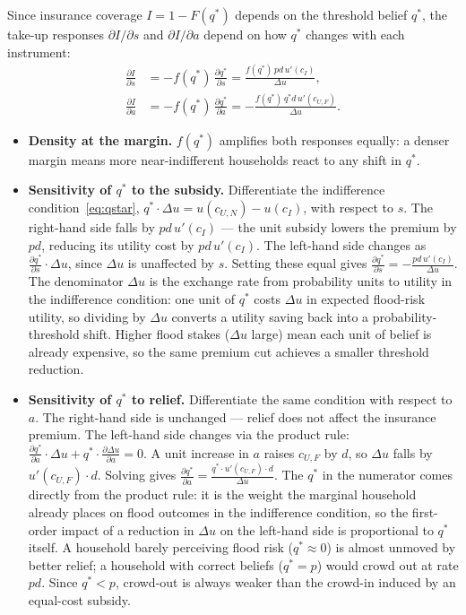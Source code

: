 \documentclass[12pt]{article}
\begin{document}
Since insurance coverage $I = 1 - F(q^*)$ depends on the threshold belief $q^*$, the take-up responses $\partial I/\partial s$ and $\partial I/\partial a$ depend on how $q^*$ changes with each instrument:
\begin{align}
    \frac{\partial I}{\partial s} &= -f(q^*)\,\frac{\partial q^*}{\partial s}
    = \frac{f(q^*)\,pd\,u'(c_I)}{\Delta u}, \label{eq:dI_s} \\
    \frac{\partial I}{\partial a} &= -f(q^*)\,\frac{\partial q^*}{\partial a}
    = -\frac{f(q^*)\,q^*d\,u'(c_{U,F})}{\Delta u}. \label{eq:dI_a}
\end{align}
\begin{itemize}
    \item \textbf{Density at the margin.} $f(q^*)$ amplifies both responses equally: a denser margin means more near-indifferent households react to any shift in $q^*$.

    \item \textbf{Sensitivity of $q^*$ to the subsidy.}
    Differentiate the indifference condition~\eqref{eq:qstar}, $q^*\cdot\Delta u = u(c_{U,N})-u(c_I)$, with respect to $s$. The right-hand side falls by $pd\,u'(c_I)$ — the unit subsidy lowers the premium by $pd$, reducing its utility cost by $pd\,u'(c_I)$. The left-hand side changes as $\frac{\partial q^*}{\partial s}\cdot\Delta u$, since $\Delta u$ is unaffected by $s$. Setting these equal gives $\frac{\partial q^*}{\partial s}=-\frac{pd\,u'(c_I)}{\Delta u}$. The denominator $\Delta u$ is the exchange rate from probability units to utility in the indifference condition: one unit of $q^*$ costs $\Delta u$ in expected flood-risk utility, so dividing by $\Delta u$ converts a utility saving back into a probability-threshold shift. Higher flood stakes ($\Delta u$ large) mean each unit of belief is already expensive, so the same premium cut achieves a smaller threshold reduction.

    \item \textbf{Sensitivity of $q^*$ to relief.}
    Differentiate the same condition with respect to $a$. The right-hand side is unchanged — relief does not affect the insurance premium. The left-hand side changes via the product rule: $\frac{\partial q^*}{\partial a}\cdot\Delta u + q^*\cdot\frac{\partial\Delta u}{\partial a}=0$. A unit increase in $a$ raises $c_{U,F}$ by $d$, so $\Delta u$ falls by $u'(c_{U,F})\cdot d$. Solving gives $\frac{\partial q^*}{\partial a} = \frac{q^*\cdot u'(c_{U,F})\cdot d}{\Delta u}$. The $q^*$ in the numerator comes directly from the product rule: it is the weight the marginal household already places on flood outcomes in the indifference condition, so the first-order impact of a reduction in $\Delta u$ on the left-hand side is proportional to $q^*$ itself. A household barely perceiving flood risk ($q^*\approx 0$) is almost unmoved by better relief; a household with correct beliefs ($q^*=p$) would crowd out at rate $pd$. Since $q^*<p$, crowd-out is always weaker than the crowd-in induced by an equal-cost subsidy.
\end{itemize}
\end{document}
